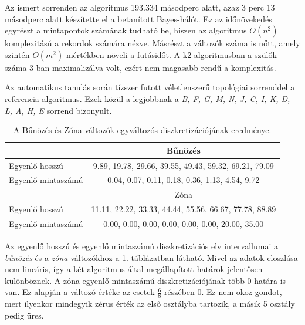 Az ismert sorrenden az algoritmus 193.334 másodperc alatt, azaz 3 perc 13 másodperc alatt készítette el a betanított Bayes-hálót. Ez az időnövekedés egyrészt a mintapontok számának tudható be, hiszen az algoritmus $O(n^2)$ komplexitású a rekordok számára nézve. Másrészt a változók száma is nőtt, amely szintén $O(m^2)$ mértékben növeli a futásidőt. A k2 algoritmusban a szülők száma 3-ban maximalizálva volt, ezért nem magasabb rendű a komplexitás.

Az automatikus tanulás során tízszer futott véletlenszerű topológiai sorrenddel a referencia algoritmus. Ezek közül a legjobbnak a \emph{B, F, G, M, N, J, C, I, K, D, L, A, H, E} sorrend bizonyult.

\begin{table}[htp]\centering
    \begin{tabular}{lc}
            & Bűnözés                                                          \\ \hline
    Egyenlő hosszú     & 9.89,  19.78,    29.66,  39.55,  49.43,    59.32,  69.21,  79.09 \\
    Egyenlő mintaszámú & 0.04,  0.07,    0.11,  0.18,  0.36,    1.13,  4.54,  9.72       \\ \hline

    & Zóna                                                              \\ \hline
    Egyenlő hosszú     & 11.11,  22.22,    33.33,  44.44,  55.56,    66.67,  77.78,  88.89 \\
    Egyenlő mintaszámú & 0.00,  0.00,    0.00,  0.00,  0.00,    0.00,  20.00,  35.00
    \end{tabular}
\caption{A Bűnözés és Zóna változók egyváltozós diszkretizációjának eredménye.}
\label{tab:housing_egyszeru_intervallumok}
\end{table}

Az egyenlő hosszú és egyenlő mintaszámú diszkretizációs elv intervallumai a \emph{bűnözés} és a \emph{zóna} változókhoz a \ref{tab:housing_egyszeru_intervallumok}. táblázatban látható. Mivel az adatok eloszlása nem lineáris, így a két algoritmus által megállapított határok jelentősen különböznek. A zóna egyenlő mintaszámú diszkretizációjának több 0 határa is van. Ez alapján a változó értéke az esetek $\frac{6}{8}$ részében 0. Ez nem okoz gondot, mert ilyenkor mindegyik zérus érték az első osztályba tartozik, a másik 5 osztály pedig üres.


